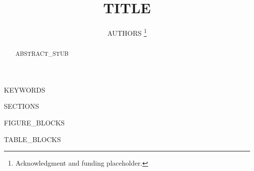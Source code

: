 \documentclass[conference]{IEEEtran}
\begin{document}
\graphicspath{{./figures/}}

\title{{{TITLE}}}

\author{
{{AUTHORS}}
\thanks{Acknowledgment and funding placeholder.}
}

\IEEEoverridecommandlockouts
\maketitle

\begin{abstract}
{{ABSTRACT_STUB}}
\end{abstract}

\begin{IEEEkeywords}
{{KEYWORDS}}
\end{IEEEkeywords}

{{SECTIONS}}

{{FIGURE_BLOCKS}}

{{TABLE_BLOCKS}}

\begingroup
\makeatletter
\let\oldthebibliography\thebibliography
\let\endoldthebibliography\endthebibliography
\renewenvironment{thebibliography}[1]{%
    \oldthebibliography{#1}%
    \fontsize{7}{7.15}\selectfont
    \setlength{\itemsep}{0pt}%
    \setlength{\parskip}{0pt}%
}{\endoldthebibliography}
\makeatother


\endgroup
\end{document}
